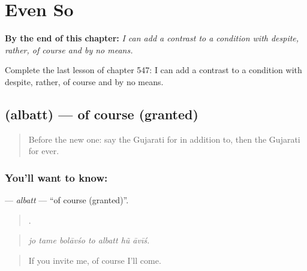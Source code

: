 
\chapter{Even So}
\label{ch:gu-even-so}

\begin{chapteropening}
\textbf{By the end of this chapter:} \emph{I can add a contrast to a condition with despite, rather, of course and by no means.}

Complete the last lesson of chapter 547: I can add a contrast to a condition with despite, rather, of course and by no means.
\end{chapteropening}

\section[\texorpdfstring{\gu{અલબત્ત} (albatt)}{અલબત્ત (albatt)}]{ (albatt) — of course (granted)}

\label{lesson:GU-C547-albatt}



\begin{quote}
Before the new one: say the Gujarati for in addition to, then the Gujarati for ever.
\end{quote}

\subsection*{You'll want to know: }
\textbf{} — \emph{albatt} — \textquotedblleft{}of course (granted)\textquotedblright{}.

\begin{quote}
      .
\end{quote}

\begin{quote}
\emph{jo tame bolāvśo to albatt hũ āvīś.}
\end{quote}

\begin{quote}
If you invite me, of course I'll come.
\end{quote}

